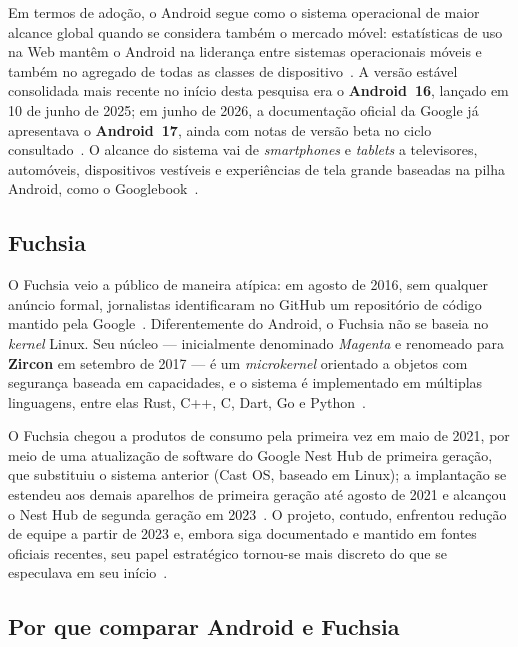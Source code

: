 \documentclass[12pt,a4paper]{article}
\begin{document}
Em termos de adoção, o Android segue como o sistema operacional de maior alcance
global quando se considera também o mercado móvel: estatísticas de uso na Web
mantêm o Android na liderança entre sistemas operacionais móveis e também no
agregado de todas as classes de dispositivo~\cite{marketshare}. A versão estável
consolidada mais recente no início desta pesquisa era o \textbf{Android~16},
lançado em 10 de junho de 2025; em junho de 2026, a documentação oficial da
Google já apresentava o \textbf{Android~17}, ainda com notas de versão beta no
ciclo consultado~\cite{android16,android17}. O alcance do sistema vai de
\emph{smartphones} e \emph{tablets} a televisores, automóveis, dispositivos
vestíveis e experiências de tela grande baseadas na pilha Android, como o
Googlebook~\cite{googlebook}.

\subsection{Fuchsia}

O Fuchsia veio a público de maneira atípica: em agosto de 2016, sem qualquer
anúncio formal, jornalistas identificaram no GitHub um repositório de código
mantido pela Google~\cite{fuchsiawiki}. Diferentemente do Android, o Fuchsia não
se baseia no \emph{kernel} Linux. Seu núcleo --- inicialmente denominado
\emph{Magenta} e renomeado para \textbf{Zircon} em setembro de 2017 --- é um
\emph{microkernel} orientado a objetos com segurança baseada em capacidades, e o
sistema é implementado em múltiplas linguagens, entre elas Rust, C++, C, Dart, Go
e Python~\cite{fuchsiawiki,zircon}.

O Fuchsia chegou a produtos de consumo pela primeira vez em maio de 2021, por meio
de uma atualização de software do Google Nest Hub de primeira geração, que
substituiu o sistema anterior (Cast OS, baseado em Linux); a implantação se
estendeu aos demais aparelhos de primeira geração até agosto de 2021 e alcançou o
Nest Hub de segunda geração em 2023~\cite{fuchsiawiki}. O projeto, contudo,
enfrentou redução de equipe a partir de 2023 e, embora siga documentado e
mantido em fontes oficiais recentes, seu papel estratégico tornou-se mais
discreto do que se especulava em seu início~\cite{fuchsiawiki,fuchsiadev}.

\subsection{Por que comparar Android e Fuchsia}
\label{sub:porque}
\end{document}
